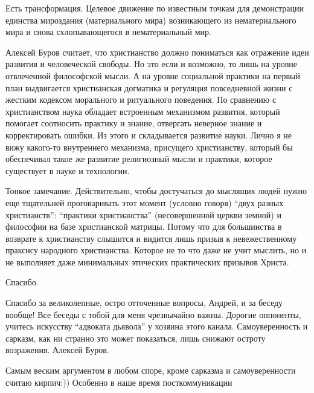 \begin{multicols}{2}
Есть трансформация. Целевое движение по известным точкам для демонстрации
единства мироздания (материального мира) возникающего из нематериального мира и
снова схлопывающегося в нематериальный мир.


Алексей Буров считает, что христианство должно пониматься как отражение идеи
развития и человеческой свободы. Но это если и возможно, то лишь на уровне
отвлеченной философской мысли. А на уровне социальной практики на первый план
выдвигается христианская догматика и регуляция повседневной жизни с жестким
кодексом морального и ритуального поведения. По сравнению с христианством наука
обладает встроенным механизмом развития, который помогает соотносить практику и
знание, отвергать неверное знание и корректировать ошибки. Из этого и
складывается развитие науки. Лично я не вижу какого-то внутреннего механизма,
присущего христианству, который бы обеспечивал такое же развитие религиозный
мысли и практики, которое существует в науке и технологии.


Тонкое замечание. Действительно, чтобы достучаться до мыслящих людей нужно еще
тщательней проговаривать этот момент (условно говоря) \enquote{двух разных
христианств}: \enquote{практики христианства} (несовершенной церкви земной) и философии
на базе христианской матрицы. Потому что для большинства в возврате к
христианству слышится и видится лишь призыв к невежественному праксису
народного христианства. Которое не то что даже не учит мыслить, но и не
выполняет даже минимальных этических практических призывов Христа.

Спасибо.


Спасибо за великолепные, остро отточенные вопросы, Андрей, и за беседу вообще!
Все беседы с тобой для меня чрезвычайно важны.  Дорогие оппоненты, учитесь
искусству \enquote{адвоката дьявола} у хозяина этого канала. Самоуверенность и сарказм,
как ни странно это может показаться, лишь снижают остроту возражения. Алексей
Буров.

\begin{itemize} %

Самым веским аргументом в любом споре, кроме сарказма и самоуверенности считаю
кирпич:)) Особенно в наше время посткоммуникации



\end{itemize}
\end{multicols}

